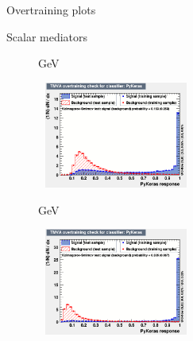 \documentclass[8pt]{beamer}
\begin{document}
\begin{frame}{Overtraining plots}
\justifying
\begin{block}{\centering Scalar mediators}\end{block} \vspace{-10pt}
\begin{figure}[htbp]
\centering
\begin{minipage}[b]{.49\textwidth}
\vspace{-5pt}
\begin{block}{ GeV}\end{block}
\begin{center}
\includegraphics[width=5.2cm, height=3.5cm]{figs/overtraining_scalar100.png}
\end{center}
\end{minipage}
\begin{minipage}[b]{.02\textwidth}\end{minipage}
\begin{minipage}[b]{.49\textwidth}
\vspace{-5pt}
\begin{block}{ GeV}\end{block}
\begin{center}
\includegraphics[width=5.2cm, height=3.5cm]{figs/overtraining_scalar500.png}
\end{center}
\end{minipage}
\end{figure} \vfill


\end{frame}
\end{document}
